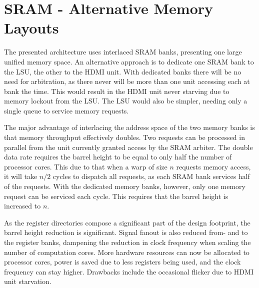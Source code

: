\section{SRAM - Alternative Memory Layouts}

The presented architecture uses interlaced SRAM banks, presenting one large unified memory space.
An alternative approach is to dedicate one SRAM bank to the LSU, the other to the HDMI unit.
With dedicated banks there will be no need for arbitration, as there never will be more than one unit accessing each at bank the time.
This would result in the HDMI unit never starving due to memory lockout from the LSU.
The LSU would also be simpler, needing only a single queue to service memory requests.

The major advantage of interlacing the address space of the two memory banks is that memory throughput effectively doubles.
Two requests can be processed in parallel from the unit currently granted access by the SRAM arbiter.
The double data rate requires the barrel height to be equal to only half the number of processor cores.
This due to that when a warp of size $n$ requests memory access, it will take $n/2$ cycles to dispatch all requests, as each SRAM bank services half of the requests.
With the dedicated memory banks, however, only one memory request can be serviced each cycle.
This requires that the barrel height is increased to $n$.

As the register directories compose a significant part of the design footprint, the barrel height reduction is significant.
Signal fanout is also reduced from- and to the register banks, dampening the reduction in clock frequency when scaling the number of computation cores.
More hardware resources can now be allocated to processor cores, power is saved due to less registers being used, and the clock frequency can stay higher.
Drawbacks include the occasional flicker due to HDMI unit starvation.
